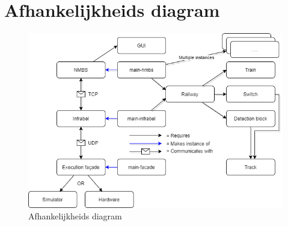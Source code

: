 \documentclass{article}
\begin{document}
\section{Afhankelijkheids diagram}
\begin{figure}[h]
        \centering
        \includegraphics[width=\textwidth]{Images/software-architecture PP2.png}
        \caption{Afhankelijkheids diagram}
\end{figure}
\pagebreak
\end{document}
